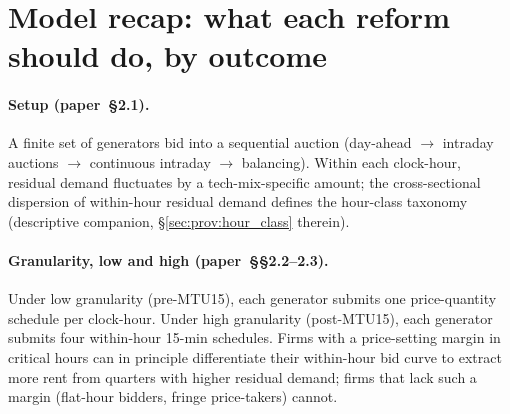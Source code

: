 \documentclass[11pt,a4paper]{article}
\begin{document}
\section{Model recap: what each reform should do, by outcome}\label{sec:ident:model_recap}

\paragraph{Setup (paper~\S2.1).} A finite set of generators bid into a sequential auction (day-ahead $\to$ intraday auctions $\to$ continuous intraday $\to$ balancing). Within each clock-hour, residual demand fluctuates by a tech-mix-specific amount; the cross-sectional dispersion of within-hour residual demand defines the hour-class taxonomy (descriptive companion, \S\ref{sec:prov:hour_class} therein).

\paragraph{Granularity, low and high (paper~\S\S2.2--2.3).} Under low granularity (pre-MTU15), each generator submits one price-quantity schedule per clock-hour. Under high granularity (post-MTU15), each generator submits four within-hour 15-min schedules. Firms with a price-setting margin in critical hours can in principle differentiate their within-hour bid curve to extract more rent from quarters with higher residual demand; firms that lack such a margin (flat-hour bidders, fringe price-takers) cannot.
\end{document}
